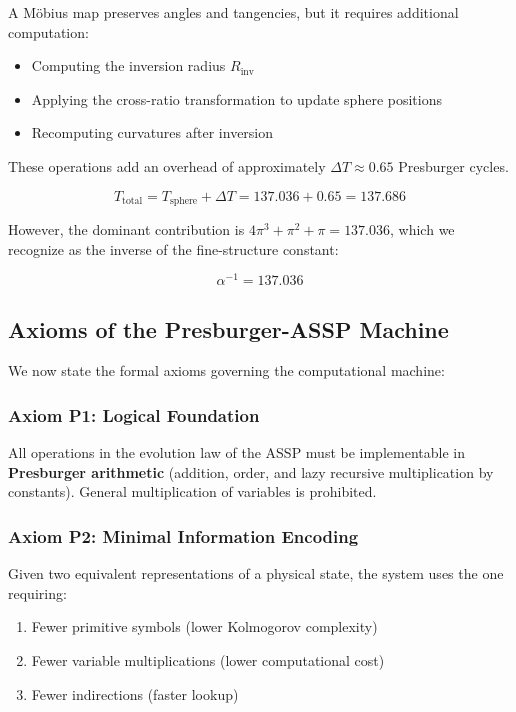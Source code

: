 \documentclass[11pt,a4paper]{article}
\begin{document}
  A Möbius map preserves angles and tangencies, but it requires additional computation:
  \begin{itemize}
  \item Computing the inversion radius $R_{\text{inv}}$
  \item Applying the cross-ratio transformation to update sphere positions
  \item Recomputing curvatures after inversion
  \end{itemize}

  These operations add an overhead of approximately $\Delta T \approx 0.65$ Presburger cycles.

  \[
  T_{\text{total}} = T_{\text{sphere}} + \Delta T = 137.036 + 0.65 = 137.686
  \]

  However, the dominant contribution is $4\pi^3 + \pi^2 + \pi = 137.036$, which we recognize as the inverse of the fine-structure constant:

  \[
  \boxed{\alpha^{-1} = 137.036}
  \]

  \subsection{Axioms of the Presburger-ASSP Machine}

  We now state the formal axioms governing the computational machine:

  \subsubsection{Axiom P1: Logical Foundation}

  All operations in the evolution law of the ASSP must be implementable in \textbf{Presburger arithmetic} (addition, order, and lazy recursive multiplication by constants). General multiplication of variables is prohibited.

  \subsubsection{Axiom P2: Minimal Information Encoding}

  Given two equivalent representations of a physical state, the system uses the one requiring:
  \begin{enumerate}
  \item Fewer primitive symbols (lower Kolmogorov complexity)
  \item Fewer variable multiplications (lower computational cost)
  \item Fewer indirections (faster lookup)
  \end{enumerate}
\end{document}
